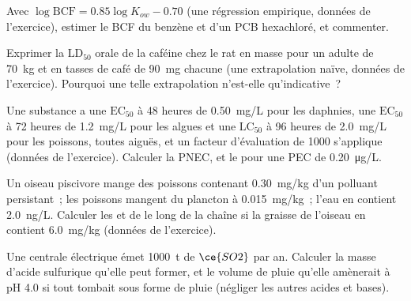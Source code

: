 \begin{exercise}[$\star\star$]\label{exo:b3:environmental-toxicology:8}
Avec $\log\mathrm{BCF} = 0.85\log K_{ow} - 0.70$ (une régression empirique, données de l'exercice), estimer le BCF du
benzène et d'un PCB hexachloré, et commenter.
\end{exercise}

\begin{exercise}[$\star\star$]\label{exo:b3:environmental-toxicology:9}
Exprimer la $\mathrm{LD_{50}}$ orale de la caféine chez le rat en masse pour un adulte de \qty{70}{kg} et en tasses de café de
\qty{90}{mg} chacune (une extrapolation naïve, données de l'exercice). Pourquoi une telle extrapolation n'est-elle qu'indicative~?
\end{exercise}

\begin{exercise}[$\star\star\star$]\label{exo:b3:environmental-toxicology:10}
Une substance a une $\mathrm{EC_{50}}$ à 48 heures de \qty{0.50}{mg/L} pour les daphnies, une $\mathrm{EC_{50}}$ à 72 heures de \qty{1.2}{mg/L} pour les algues
et une $\mathrm{LC_{50}}$ à 96 heures de \qty{2.0}{mg/L} pour les poissons, toutes aiguës, et un facteur d'évaluation de 1000 s'applique
(données de l'exercice). Calculer la PNEC, et le  pour une PEC de \qty{0.20}{\micro g/L}.
\end{exercise}

\begin{exercise}[$\star\star\star$]\label{exo:b3:environmental-toxicology:11}
Un oiseau piscivore mange des poissons contenant \qty{0.30}{mg/kg} d'un polluant persistant~; les poissons mangent
du plancton à \qty{0.015}{mg/kg}~; l'eau en contient \qty{2.0}{ng/L}. Calculer les  et de
 le long de la chaîne si la graisse de l'oiseau en contient \qty{6.0}{mg/kg} (données de
l'exercice).
\end{exercise}

\begin{exercise}[$\star\star\star$]\label{exo:b3:environmental-toxicology:12}
Une centrale électrique émet \qty{1000}{t} de $\ce{SO2}$ par an. Calculer la masse d'acide sulfurique qu'elle peut former,
et le volume de pluie qu'elle amènerait à pH 4.0 si tout tombait sous forme de pluie (négliger les autres
acides et bases).
\end{exercise}

